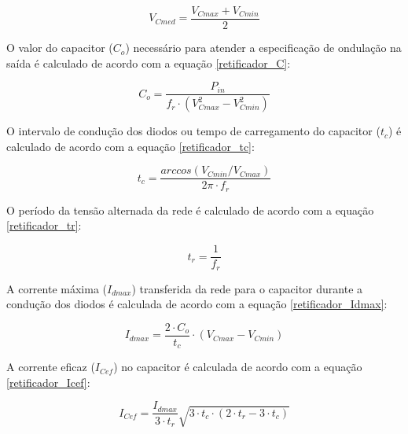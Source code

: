 \begin{apendicesenv}
    \begin{equation}
        V_{Cmed} = \frac{V_{Cmax} + V_{Cmin}}{2}
        \label{retificador_Vcmed}
    \end{equation}
    
O valor do capacitor ($C_{o}$) necessário para atender a especificação de ondulação na saída é calculado de acordo com a equação \ref{retificador_C}:
    
    \begin{equation}
        C_{o} = \frac{P_{in}}{f_{r} \cdot \left( V_{Cmax}^{2} - V_{Cmin}^{2} \right)}
        \label{retificador_C}
    \end{equation}
    

O intervalo de condução dos diodos ou tempo de carregamento do capacitor ($t_{c}$) é calculado de acordo com a equação \ref{retificador_tc}:
    
    \begin{equation}
        t_{c} = \frac{arc cos(V_{Cmin}/V_{Cmax})}{2 \pi \cdot f_{r}}
        \label{retificador_tc}
    \end{equation}
    
O período da tensão alternada da rede é calculado de acordo com a equação \ref{retificador_tr}:
    
    \begin{equation}
        t_{r} = \frac{1}{f_{r}}
        \label{retificador_tr}
    \end{equation}

A corrente máxima ($I_{dmax}$) transferida da rede para o capacitor durante a condução dos diodos é calculada de acordo com a equação \ref{retificador_Idmax}:

    \begin{equation}
        I_{dmax} = \frac{2 \cdot C_{o}}{t_{c}} \cdot \left( V_{Cmax} - V_{Cmin} \right)
        \label{retificador_Idmax}
    \end{equation}
    
A corrente eficaz ($I_{Cef}$) no capacitor é calculada de acordo com a equação \ref{retificador_Icef}:
    
    \begin{equation}
        I_{Cef} = \frac{I_{dmax}}{3 \cdot t_{r}} \sqrt{3 \cdot t_{c} \cdot \left( 2 \cdot t_{r} - 3 \cdot t_{c} \right) }
        \label{retificador_Icef}
    \end{equation}
    

\end{apendicesenv}
